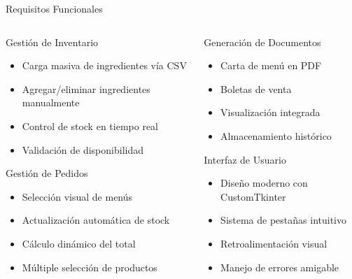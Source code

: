 \documentclass[12pt]{beamer}
\begin{document}
\begin{frame}{Requisitos Funcionales}
  \begin{columns}[t]
    \begin{column}{0.5\textwidth}
      \begin{exampleblock}{Gestión de Inventario}
        \begin{itemize}[<+->]
          \item Carga masiva de ingredientes vía CSV
          \item Agregar/eliminar ingredientes manualmente
          \item Control de stock en tiempo real
          \item Validación de disponibilidad
        \end{itemize}
      \end{exampleblock}
      
      \begin{exampleblock}{Gestión de Pedidos}
        \begin{itemize}[<+->]
          \item Selección visual de menús
          \item Actualización automática de stock
          \item Cálculo dinámico del total
          \item Múltiple selección de productos
        \end{itemize}
      \end{exampleblock}
    \end{column}
    
    \begin{column}{0.5\textwidth}
      \begin{exampleblock}{Generación de Documentos}
        \begin{itemize}[<+->]
          \item Carta de menú en PDF
          \item Boletas de venta
          \item Visualización integrada
          \item Almacenamiento histórico
        \end{itemize}
      \end{exampleblock}
      
      \begin{exampleblock}{Interfaz de Usuario}
        \begin{itemize}[<+->]
          \item Diseño moderno con CustomTkinter
          \item Sistema de pestañas intuitivo
          \item Retroalimentación visual
          \item Manejo de errores amigable
        \end{itemize}
      \end{exampleblock}
    \end{column}
  \end{columns}
\end{frame}
\end{document}
